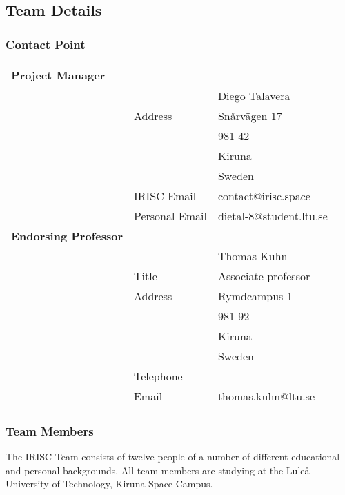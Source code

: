 \subsection{Team Details}
\subsubsection{Contact Point}


\begin{tabular}{m{} m{} m{}}
	\textbf{Project Manager} & & \\	\hline
	 & & Diego Talavera \\
	 & Address & Snårvägen 17 \\
	 & & 981 42 \\
	 & & Kiruna \\
	 & & Sweden \\
	 & IRISC Email & contact@irisc.space \\
	 & Personal Email & dietal-8@student.ltu.se\\
	 \textbf{Endorsing Professor} & & \\ \hline
	 & & Thomas Kuhn \\
	 & Title & Associate professor \\
	 & Address & Rymdcampus 1 \\
	 & &  981 92 \\
	 & & Kiruna \\
	 & & Sweden \\
	 & Telephone & \\
	 & Email & thomas.kuhn@ltu.se \\

\end{tabular}

\subsubsection{Team Members}
The IRISC Team consists of twelve people of a number of different educational and personal backgrounds. All team members are studying at the Lule{\aa} University of Technology, Kiruna Space Campus.

\bigskip

